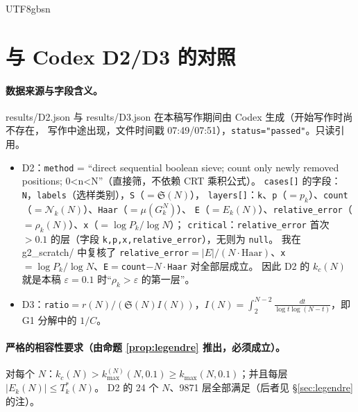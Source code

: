 \documentclass[11pt,a4paper]{article}
\newcommand{\Haar}{\mu}
\newcommand{\Sing}{\mathfrak S}
\newcommand{\Cnt}{\mathcal N}          %
\newcommand{\Tmix}{T^{*}}               %
\newcommand{\kmax}{k_{\max}}
\theoremstyle{plain}
\theoremstyle{definition}
\begin{document}
\begin{CJK}{UTF8}{gbsn}
\section{与 Codex D2/D3 的对照}\label{sec:D2}

\paragraph{数据来源与字段含义。} results/D2.json 与 results/D3.json 在本稿写作期间由 Codex 生成（开始写作时尚不存在，
写作中途出现，文件时间戳 07:49/07:51），\texttt{status="passed"}。只读引用。
\begin{itemize}[leftmargin=*]
\item D2：\texttt{method} = ``direct sequential boolean sieve; count only newly removed positions; 0<n<N''（直接筛，不依赖 CRT 乘积公式）。
\texttt{cases[]} 的字段：\texttt{N}，\texttt{labels}（选样类别），\texttt{S}（$=\Sing(N)$），
\texttt{layers[]}：\texttt{k}、\texttt{p}（$=p_k$）、\texttt{count}（$=\Cnt_k(N)$）、\texttt{Haar}（$=\Haar(G_k^N)$）、
\texttt{E}（$=E_k(N)$）、\texttt{relative\_error}（$=\rho_k(N)$）、\texttt{x}（$=\log P_k/\log N$）；
\texttt{critical}：\texttt{relative\_error} 首次 $>0.1$ 的层（字段 \texttt{k,p,x,relative\_error}），无则为 \texttt{null}。
我在 g2\_scratch/ 中复核了 \texttt{relative\_error}$=|E|/(N\cdot\mathrm{Haar})$、\texttt{x}$=\log P_k/\log N$、\texttt{E}$=$\texttt{count}$-N\cdot$\texttt{Haar} 对全部层成立。
因此 D2 的 $k_c(N)$ 就是本稿 $\varepsilon=0.1$ 时“$\rho_k>\varepsilon$ 的第一层”。
\item D3：\texttt{ratio}$=r(N)/(\Sing(N)I(N))$，$I(N)=\int_2^{N-2}\frac{dt}{\log t\log(N-t)}$，即 G1 分解中的 $1/C$。
\end{itemize}

\paragraph{严格的相容性要求（由命题 \ref{prop:legendre} 推出，必须成立）。}
对每个 $N$：$k_c(N)>\kmax^{(N)}(N,0.1)\ge\kmax(N,0.1)$；并且每层 $|E_k(N)|\le\Tmix_k(N)$。
D2 的 24 个 $N$、9871 层全部满足（后者见 \S\ref{sec:legendre} 的注）。


\end{CJK}
\end{document}
